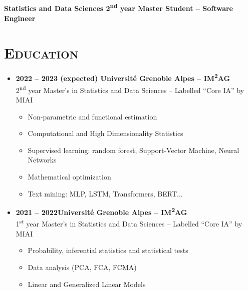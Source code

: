 \documentclass{article}
\begin{document}
\begin{minipage}{0.8\textwidth}
\begin{flushleft}
\begin{minipage}{1\textwidth}
\begin{minipage}{.5\textwidth}
\begin{flushright}
\begin{minipage}{.24\textwidth}
\begin{flushright}
            \end{flushright}
            \end{minipage}
        \end{flushright}
        \end{minipage}
    \end{minipage}
    \\[.3 cm]
    \textbf{Statistics and Data Sciences 2\textsuperscript{nd} year Master Student – Software Engineer}
    \\[.5 cm]
    \section*{\textsc{Education}}
    \begin{itemize}
        \item \textbf{2022 – 2023 (expected) \qquad Université Grenoble Alpes – IM\textsuperscript{2}AG} \\
        2\textsuperscript{nd} year Master’s in Statistics and Data Sciences – Labelled “Core IA” by MIAI
        \vspace{-.15cm}
        \begin{itemize}[leftmargin=*]
        \setlength\itemsep{.01cm}
            \item Non-parametric and functional estimation
            \item Computational and High Dimensionality Statistics
            \item Supervised learning: random forest, Support-Vector Machine, Neural Networks
            \item Mathematical optimization
            \item Text mining: MLP, LSTM, Transformers, BERT...
        \end{itemize}
        \item \textbf{2021 – 2022\qquad \qquad \qquad \qquad Université Grenoble Alpes – IM\textsuperscript{2}AG} \\
        1\textsuperscript{st} year Master’s in Statistics and Data Sciences – Labelled “Core IA” by MIAI
        \vspace{-.15cm}
        \begin{itemize}[leftmargin=*]
        \setlength\itemsep{.01cm}
            \item Probability, inferential statistics and statistical tests
            \item Data analysis (PCA, FCA, FCMA)
            \item Linear and Generalized Linear Models

\end{itemize}
\end{itemize}
\end{flushleft}
\end{minipage}
\end{document}
